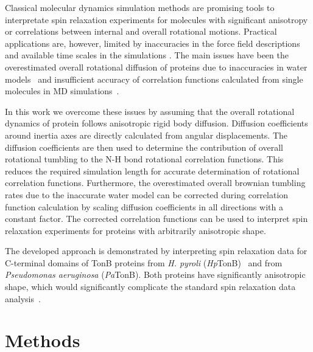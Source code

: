 \documentclass[pre,aps,floatfix,authordate1-4,twocolumn]{revtex4-1}
\begin{document}
 
Classical molecular dynamics simulation methods are
promising tools to interpretate spin relaxation experiments
for molecules with significant anisotropy or correlations between
internal and overall rotational motions. Practical applications
are, however, limited by inaccuracies in the force field descriptions
and available time scales in the simulations \cite{prompers02,maragakis08,trbovic08,wong08,anderson12}.
The main issues have been the overestimated overall rotational diffusion of proteins
due to inaccuracies in water models~\cite{wong08} and
insufficient accuracy of correlation functions calculated from
single molecules in MD simulations~\cite{lu06,anderson12}.

In this work we overcome these issues by assuming that the overall
rotational dynamics of protein follows anisotropic rigid body diffusion.
Diffusion coefficients around inertia axes are 
directly calculated from angular displacements.
The diffusion coefficients are then used to determine the
contribution of overall rotational tumbling to the 
N-H bond rotational correlation functions.
This reduces the required simulation length for accurate determination
of rotational correlation functions. Furthermore, the overestimated
overall brownian tumbling rates due to the inaccurate water model
can be corrected during correlation function calculation by scaling
diffusion coefficients in all directions with a constant factor.
The corrected correlation functions can be used to interpret spin relaxation
experiments for proteins with arbitrarily anisotropic shape.

The developed approach is demonstrated by interpreting spin relaxation data 
for C-terminal domains of TonB proteins from {\it H. pyroli} ({\it Hp}TonB)~\cite{ciragan16}
and from {\it Pseudomonas aeruginosa} ({\it Pa}TonB). Both proteins have significantly
anisotropic shape, which would significantly complicate the standard spin relaxation data
analysis~\cite{woessner62,shimizu62,jarymowycz06,korzhnev01,luginbuhl97,hall04}.


\section{Methods}
\end{document}
